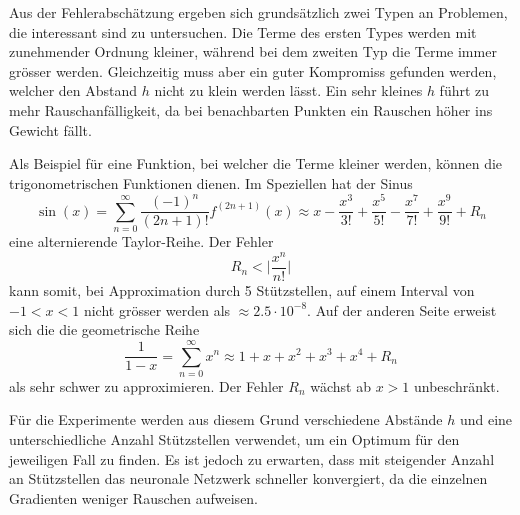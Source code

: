 Aus der Fehlerabschätzung ergeben sich grundsätzlich zwei Typen an Problemen, die interessant sind zu untersuchen.
Die Terme des ersten Types werden mit zunehmender Ordnung kleiner, während bei dem zweiten Typ die Terme immer grösser werden.
Gleichzeitig muss aber ein guter Kompromiss gefunden werden, welcher den Abstand $h$ nicht zu klein werden lässt.
Ein sehr kleines $h$ führt zu mehr Rauschanfälligkeit, da bei benachbarten Punkten ein Rauschen höher ins Gewicht fällt.
%

Als Beispiel für eine Funktion, bei welcher die Terme kleiner werden, können die trigonometrischen Funktionen dienen.
Im Speziellen hat der Sinus
\begin{equation}
\sin(x)
=
\sum _{n=0}^{\infty}\frac{(-1)^{n}}{(2n+1)!}f^{(2n+1)} (x)
\approx
x-{\frac{x^3}{3!}}+\frac{x^5}{5!}-\frac{x^7}{7!}+\frac{x^9}{9!}+R_n
\end{equation}
eine alternierende Taylor-Reihe.
Der Fehler
\begin{equation}
R_n < \biggl| {\frac{x^{n}}{n!} \biggr|}
\end{equation}
kann somit, bei Approximation durch 5 Stützstellen, auf einem Interval von $-1<x<1$ nicht grösser werden als $\approx 2.5 \cdot 10^{-8}$.
Auf der anderen Seite erweist sich die die geometrische Reihe
\begin{equation}
	\frac{1}{1-x} = \sum _{n=0}^{\infty} x^n \approx 1 + x + x^2 + x^3 + x^4 + R_n
\end{equation}
als sehr schwer zu approximieren.
Der Fehler $R_n$ wächst ab $x>1$ unbeschränkt.

Für die Experimente werden aus diesem Grund verschiedene Abstände
$h$ und eine unterschiedliche Anzahl Stützstellen verwendet, um ein
Optimum für den jeweiligen Fall zu finden.
Es ist jedoch zu erwarten, dass mit steigender Anzahl an Stützstellen
das neuronale Netzwerk schneller konvergiert, da die einzelnen
Gradienten weniger Rauschen aufweisen.
%
